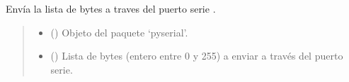 \documentclass[letterpaper,10pt,english]{sphinxmanual}
\begin{document}
\begin{fulllineitems}
\label{\detokenize{fpga.interfaz_pcps:fpga.interfaz_pcps.send_bytestr}}
\pysigstartsignatures
{}
\pysigstopsignatures
\sphinxAtStartPar
Envía la lista de bytes  a traves del puerto serie .
\begin{quote}\begin{description}
\begin{itemize}
\item {} 
\sphinxAtStartPar
{} () \textendash{} Objeto  del paquete ‘pyserial’.

\item {} 
\sphinxAtStartPar
{} () \textendash{} Lista de bytes (entero entre 0 y 255) a enviar a través del puerto serie.

\end{itemize}


\end{description}\end{quote}

\end{fulllineitems}

\end{document}
